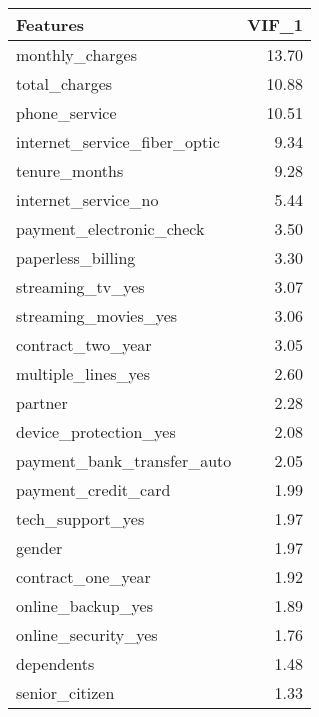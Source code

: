 \begin{tabular}{lr}
\toprule
                    Features &  VIF\_1 \\
\midrule
             monthly\_charges &  13.70 \\
               total\_charges &  10.88 \\
               phone\_service &  10.51 \\
internet\_service\_fiber\_optic &   9.34 \\
               tenure\_months &   9.28 \\
         internet\_service\_no &   5.44 \\
    payment\_electronic\_check &   3.50 \\
           paperless\_billing &   3.30 \\
            streaming\_tv\_yes &   3.07 \\
        streaming\_movies\_yes &   3.06 \\
           contract\_two\_year &   3.05 \\
          multiple\_lines\_yes &   2.60 \\
                     partner &   2.28 \\
       device\_protection\_yes &   2.08 \\
  payment\_bank\_transfer\_auto &   2.05 \\
         payment\_credit\_card &   1.99 \\
            tech\_support\_yes &   1.97 \\
                      gender &   1.97 \\
           contract\_one\_year &   1.92 \\
           online\_backup\_yes &   1.89 \\
         online\_security\_yes &   1.76 \\
                  dependents &   1.48 \\
              senior\_citizen &   1.33 \\
\bottomrule
\end{tabular}
